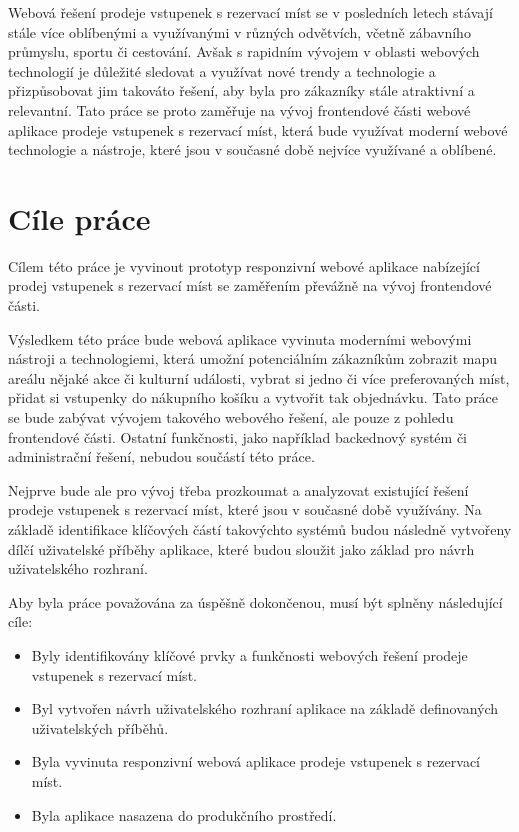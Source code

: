 Webová řešení prodeje vstupenek s rezervací míst se v posledních letech stávají stále více oblíbenými a využívanými v různých odvětvích, včetně zábavního průmyslu, sportu či cestování.
Avšak s rapidním vývojem v oblasti webových technologií je důležité sledovat a využívat nové trendy a technologie a přizpůsobovat jim takováto řešení, aby byla pro zákazníky stále atraktivní a relevantní.
Tato práce se proto zaměřuje na vývoj frontendové části webové aplikace prodeje vstupenek s rezervací míst, která bude využívat moderní webové technologie a nástroje, které jsou v současné době nejvíce využívané a oblíbené.

\section*{Cíle práce}
\label{sec:uvod-cile-prace}
Cílem této práce je vyvinout prototyp responzivní webové aplikace nabízející prodej vstupenek s rezervací míst se zaměřením převážně na vývoj frontendové části.

Výsledkem této práce bude webová aplikace vyvinuta moderními webovými nástroji a technologiemi, která umožní potenciálním zákazníkům zobrazit mapu areálu nějaké akce či kulturní události, vybrat si jedno či více preferovaných míst, přidat si vstupenky do nákupního košíku a vytvořit tak objednávku.
Tato práce se bude zabývat vývojem takového webového řešení, ale pouze z pohledu frontendové části.
Ostatní funkčnosti, jako například backednový systém či administrační řešení, nebudou součástí této práce.

Nejprve bude ale pro vývoj třeba prozkoumat a analyzovat existující řešení prodeje vstupenek s rezervací míst, které jsou v současné době využívány.
Na základě identifikace klíčových částí takovýchto systémů budou následně vytvořeny dílčí uživatelské příběhy aplikace, které budou sloužit jako základ pro návrh uživatelského rozhraní.

Aby byla práce považována za úspěšně dokončenou, musí být splněny následující cíle:

\begin{itemize}
    \item Byly identifikovány klíčové prvky a funkčnosti webových řešení prodeje vstupenek s rezervací míst.
    \item Byl vytvořen návrh uživatelského rozhraní aplikace na základě definovaných uživatelských příběhů.
    \item Byla vyvinuta responzivní webová aplikace prodeje vstupenek s rezervací míst.
    \item Byla aplikace nasazena do produkčního prostředí.
\end{itemize}
